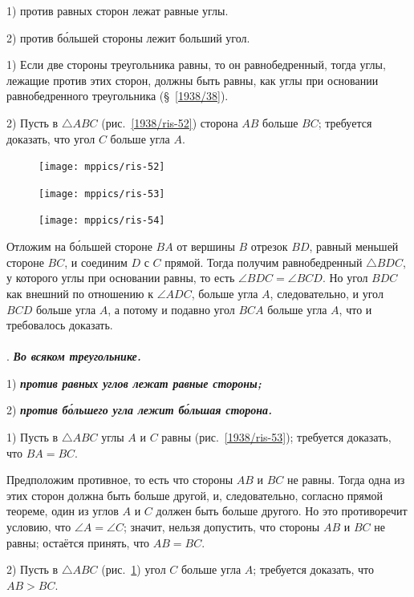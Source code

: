 \documentclass[oneside]{book}
\begin{document}
1) против равных сторон лежат равные углы.

2) против б\'{о}льшей стороны лежит больший угол.

1) Если две стороны треугольника равны, то он равнобедренный, тогда углы, лежащие против этих сторон, должны быть равны, как углы при основании равнобедренного треугольника (§~\ref{1938/38}).

2) Пусть в $\triangle ABC$ (рис.~\ref{1938/ris-52}) сторона $AB$ больше $BC$;
требуется доказать, что угол $C$ больше угла $A$.

\begin{figure}
\centering
\texttt{[image: mppics/ris-52]}
\caption{}\label{1938/ris-52}
\bigskip
\texttt{[image: mppics/ris-53]}
\caption{}\label{1938/ris-53}
\bigskip
\texttt{[image: mppics/ris-54]}
\caption{}\label{1938/ris-54}
\end{figure}

Отложим на б\'{о}льшей стороне $BA$ от вершины $B$ отрезок $BD$, равный меньшей стороне $BC$, и соединим $D$ с $C$ прямой.
Тогда получим равнобедренный $\triangle BDC$, у которого углы при основании равны, то есть $\angle BDC=\angle BCD$.
Но угол $BDC$ как внешний по отношению к $\angle ADC$, больше угла $A$, следовательно, и угол $BCD$ больше угла $A$, а потому и подавно угол $BCA$ больше угла $A$, что и требовалось доказать.

\paragraph{}\label{1938/47}
\mbox{.}
\textbf{\emph{Во всяком треугольнике.}}

1) \textbf{\emph{против равных углов лежат равные стороны;}}

2) \textbf{\emph{против б\'{о}льшего угла лежит б\'{о}льшая сторона.}}

1) Пусть в $\triangle ABC$ углы $A$ и $C$ равны (рис.~\ref{1938/ris-53});
требуется доказать, что $BA = BC$.

Предположим противное, то есть что стороны $AB$ и $BC$ не равны.
Тогда одна из этих сторон должна быть больше другой, и, следовательно, согласно прямой теореме, один из углов $A$ и $C$ должен быть больше другого.
Но это противоречит условию, что $\angle A = \angle C$;
значит, нельзя допустить, что стороны $AB$ и $BC$ не равны;
остаётся принять, что $AB=BC$.

2) Пусть в $\triangle ABC$ (рис.~\ref{1938/ris-54})
угол $C$ больше угла $A$;
требуется доказать, что $AB > BC$.
\end{document}
